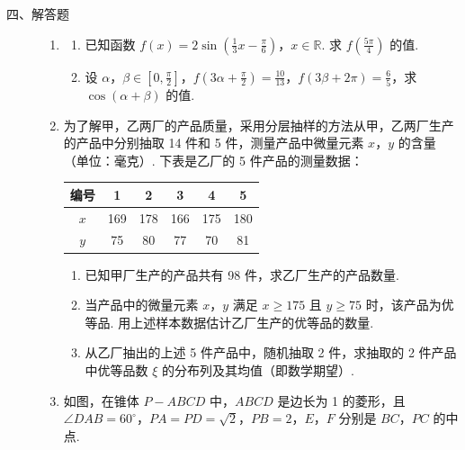 \begin{description}

    \item[四、解答题]

    \begin{enumerate}[leftmargin=5pt]

      \addtocounter{enumi}{+15}

        \item \begin{enumerate}
\item 已知函数 \(f(x) = 2\sin \left(\frac{1}{3} x - \frac{\pi}{6}\right)\)，\(x \in \mathbb{R}\). 求 \( f\left(\frac{5\pi}{4}\right) \) 的值.
\item 设 \(\alpha\)，\(\beta \in \left[0, \frac{\pi}{2}\right]\)，\(f\left(3\alpha + \frac{\pi}{2}\right) = \frac{10}{13}\)，\(f(3\beta + 2\pi) = \frac{6}{5}\)，求 \(\cos (\alpha + \beta)\) 的值.
\end{enumerate}

        \item 为了解甲，乙两厂的产品质量，采用分层抽样的方法从甲，乙两厂生产的产品中分别抽取 14 件和 5 件，测量产品中微量元素 \(x\)，\(y\) 的含量（单位：毫克）. 下表是乙厂的 5 件产品的测量数据：

\begin{center}
\begin{tabular}{|c|c|c|c|c|c|}
\hline
编号 & 1 & 2 & 3 & 4 & 5 \\
\hline
\(x\) & 169 & 178 & 166 & 175 & 180 \\
\hline
\(y\) & 75 & 80 & 77 & 70 & 81 \\
\hline
\end{tabular}
\end{center}

\begin{enumerate}
\item 已知甲厂生产的产品共有 98 件，求乙厂生产的产品数量.
\item 当产品中的微量元素 \(x\)，\(y\) 满足 \(x \geqslant 175\) 且 \(y \geqslant 75\) 时，该产品为优等品. 用上述样本数据估计乙厂生产的优等品的数量.
\item 从乙厂抽出的上述 5 件产品中，随机抽取 2 件，求抽取的 2 件产品中优等品数 \(\xi\) 的分布列及其均值（即数学期望）.
\end{enumerate}

        \item 如图，在锥体 \(P - ABCD\) 中，\(ABCD\) 是边长为 1 的菱形，且 \(\angle DAB = 60^{\circ}\)，\(PA = PD = \sqrt{2}\)，\(PB = 2\)，\(E\)，\(F\) 分别是 \(BC\)，\(PC\) 的中点.


\end{enumerate}
\end{description}
